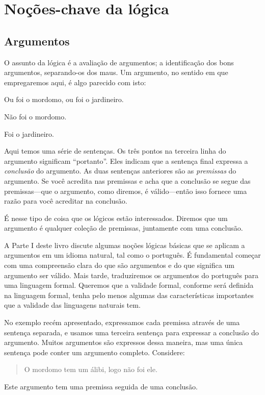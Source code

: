 \part{Noções-chave da lógica}
\label{ch.intro}


\chapter{Argumentos}
\label{s:Arguments}

O assunto da lógica é a avaliação de argumentos; a identificação dos bons argumentos, separando-os dos maus.  Um argumento, no sentido em que empregaremos aqui, é algo parecido com isto:

	\begin{earg}\label{argButlerGardner}
		\item[] Ou foi o mordomo, ou foi o jardineiro.
		\item[] Não foi o mordomo.
		\item[\therefore] Foi o jardineiro.
	\end{earg}
Aqui temos uma série de sentenças.
Os três pontos na terceira linha do argumento significam ``portanto''.
Eles indicam que a sentença final expressa a \emph{conclusão} do argumento.
As duas sentenças anteriores são as \emph{premissas} do argumento.
Se você acredita nas premissas e acha que a conclusão se segue das premissas---que o argumento, como diremos, é válido---então isso fornece uma razão para você acreditar na conclusão.

É nesse tipo de coisa que os lógicos estão interessados. Diremos que um argumento é qualquer coleção de premissas, juntamente com uma conclusão.

A Parte I deste livro discute algumas noções lógicas básicas que se aplicam a argumentos em um idioma natural, tal como o português.
É fundamental começar com uma compreensão clara do que são argumentos e do que significa um argumento ser válido.
Mais tarde, traduziremos os argumentos do português para uma linguagem formal. Queremos que a validade formal, conforme será definida na linguagem formal, tenha pelo menos algumas das características importantes que a validade das linguagens naturais tem.

No exemplo recém apresentado, expressamos cada premissa através de uma sentença separada, e usamos uma terceira sentença para expressar a conclusão do argumento.
Muitos argumentos são expressos dessa maneira, mas uma única sentença pode conter um argumento completo.
Considere:
	\begin{quote}
		O mordomo tem um álibi, logo não foi ele.
	\end{quote}
Este argumento tem uma premissa seguida de uma conclusão.

